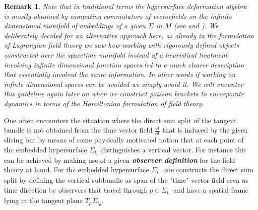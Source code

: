 \documentclass[a4paper,12pt, DIV=14, BCOR=5mm, twoside, headsepline]{scrbook}
\newtheorem*{remark}{Remark}
\begin{document}
\begin{remark}
Note that in traditional terms the hypersurface deformation algebra is mostly obtained by computing commutators of vectorfields on the infinite dimensional manifold of embeddings of a given $\Sigma$ in $M$ (see \cite{HOJMAN197688} and \cite{doi:10.1063/1.522976}). We deliberately decided for an alternative approach here, as already in the formulation of Lagrangian field theory we saw how working with rigorously defined objects constructed over the spacetime manifold instead of a heuristical treatment involving infinite dimensional function spaces led to a much clearer description that essentially involved the same information. In other words if working on infinte dimensional spaces can be avoided we simply avoid it. We will encunter this guideline again later on when we construct poisson brackets to encorporate dynamics in terms of the Hamiltonian formulation of field theory.
\end{remark}

One often encounters the situation where the direct sum split of the tangent bundle is not obtained from the time vector field $\frac{\partial}{\partial t}$ that is induced by the given slicing but by means of some physically motivated notion that at each point of the embedded hypersurface $\Sigma_{t_0}$ distinguishes a vertical vector. For instance this can be achieved by making use of a given \textit{\textbf{observer definition}} for the field theory at hand. For the embedded hypersurface $\Sigma_{t_0}$ one constructs the direct sum split by defining the vertical subbundle as span of the "time" vector field seen as time direction by observers that travel through $p \in \Sigma_{t_0}$ and have a spatial frame lying in the tangent plane $T_p\Sigma_{t_0}$.
\end{document}

